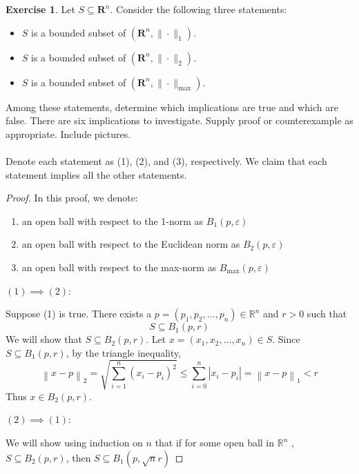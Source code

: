 \documentclass{article}
\newcommand{\R}{\mathbf{R}}
\theoremstyle{plain} %
\numberwithin{thm}{section} %
\theoremstyle{definition}
\newtheorem{exercise}[thm]{Exercise} %
\begin{document}
    \begin{exercise}
        Let $S\subseteq \R^n$. Consider the following three statements:
        \begin{itemize}
            \item $S$ is a bounded subset of $(\R^n,\|\cdot\|_1)$.
            \item $S$ is a bounded subset of $(\R^n,\|\cdot\|_2)$.
            \item $S$ is a bounded subset of $(\R^n,\|\cdot\|_{\max})$.
        \end{itemize}
        Among these statements, determine which implications are true and which are false. There are six implications to investigate. Supply proof or counterexample as appropriate. Include pictures.
        \\\\
        \noindent Denote each statement as (1), (2), and (3), respectively. We claim that each statement implies all the other statements.
        \begin{proof}
            In this proof, we denote:
            \begin{enumerate}
                \item an open ball with respect to the 1-norm as \(B_1(p, \varepsilon )\)
                \item an open ball with respect to the Euclidean norm as \(B_2(p, \varepsilon )\) 
                \item an open ball with respect to the max-norm as \(B_{\max} (p, \varepsilon )\)  
            \end{enumerate}
            \((1) \implies (2)\):

            Suppose (1) is true. There exists a \(p = (p_1, p_2, \dots, p_n) \in \mathbb{R}^n\) and \(r > 0\) such that
            \[
                S \subseteq B_1(p, r)
            \] 
            We will show that \(S \subseteq B_2(p, r)\). Let \(x = (x_1, x_2, \dots, x_n) \in S\). Since \(S \subseteq B_1(p, r)\), by the triangle inequality,
            \[
                \left\lVert x - p \right\rVert _2 = \sqrt{\sum_{i=1}^{n} (x_i - p_i)^2} \leq \sum_{i=0}^n \left\vert x_i - p_i \right\vert  = \left\lVert x - p \right\rVert _1 < r
            \]
            Thus \(x \in B_2(p, r)\).

            \noindent\((2) \implies (1)\):
            
            We will show using induction on \(n\) that if for some open ball in \(\mathbb{R} ^n\) , \(S \subseteq B_2(p, r)\),  then \(S \subseteq B_1(p, \sqrt{n} r )\) 


\end{proof}
\end{exercise}
\end{document}
